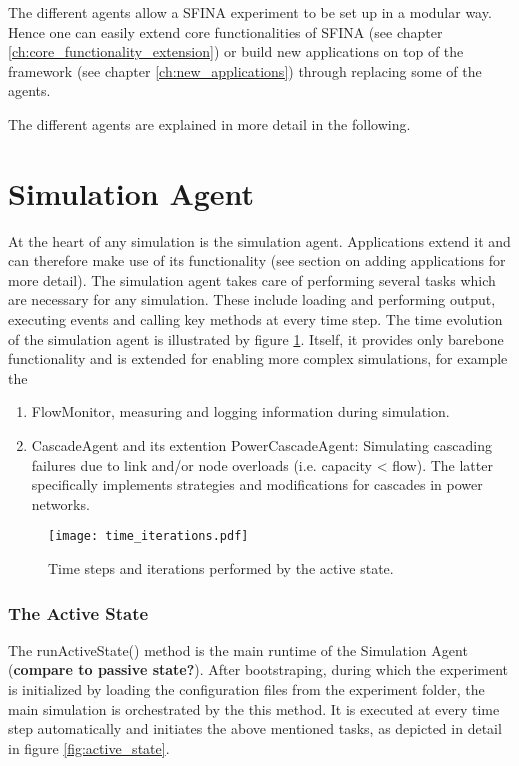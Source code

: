 \documentclass[11pt,fleqn]{book} %
\newcommand{\mainagent}{simulation agent}
\newcommand{\MainAgent}{Simulation Agent }
\newcommand{\CascadeAgent}{CascadeAgent}
\begin{document}
The different agents allow a SFINA experiment to be set up in a modular way. Hence one can easily extend core functionalities of SFINA (see chapter \ref{ch:core_functionality_extension}) or build new applications on top of the framework (see chapter \ref{ch:new_applications}) through replacing some of the agents.

The different agents are explained in more detail in the following.

\section{Simulation Agent}\label{sec:simu_agent}
At the heart of any simulation is the simulation agent. Applications extend it and can therefore make use of its functionality (see section on adding applications for more detail). The \mainagent{} takes care of performing several tasks which are necessary for any simulation. These include loading and performing output, executing events and calling key methods at every time step. The time evolution of the simulation agent is illustrated by figure \ref{fig:time_iter}. Itself, it provides only barebone functionality and is extended for enabling more complex simulations, for example the
	\begin{enumerate}
		\item FlowMonitor, measuring and logging information during simulation.
		\item \CascadeAgent{} and its extention Power\CascadeAgent{}: Simulating cascading failures due to link and/or node overloads (i.e. capacity < flow). The latter specifically implements strategies and modifications for cascades in power networks.
	\end{enumerate}

\begin{figure}[!h]
\centering\texttt{[image: time\_iterations.pdf]}
\caption{Time steps and iterations performed by the active state.}
\label{fig:time_iter}
\end{figure}

\subsubsection{The Active State}
The runActiveState() method is the main runtime of the \MainAgent{} (\textbf{compare to passive state?}). After bootstraping, during which the experiment is initialized by loading the configuration files from the experiment folder, the main simulation is orchestrated by the this method. It is executed at every time step automatically and initiates the above mentioned tasks, as depicted in detail in figure \ref{fig:active_state}.
\end{document}
